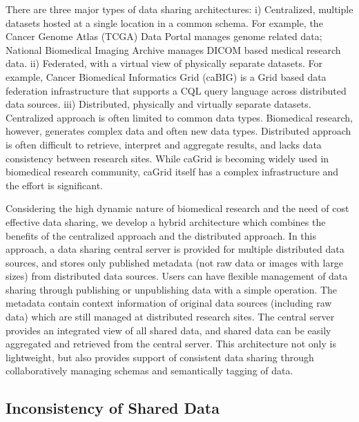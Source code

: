 \documentclass{doublecol-new}
\theoremstyle{TH}{
\newtheorem{lemma}{Lemma}
\newtheorem{theorem}[lemma]{Theorem}
\newtheorem{corrolary}[lemma]{Corrolary}
\newtheorem{conjecture}[lemma]{Conjecture}
\newtheorem{proposition}[lemma]{Proposition}
\newtheorem{claim}[lemma]{Claim}
\newtheorem{stheorem}[lemma]{Wrong Theorem}
\newtheorem{algorithm}{Algorithm}
}
\theoremstyle{THrm}{
\newtheorem{definition}{Definition}[section]
\newtheorem{question}{Question}[section]
\newtheorem{remark}{Remark}
\newtheorem{scheme}{Scheme}
}
\theoremstyle{THhit}{
\newtheorem{case}{Case}[section]
}
\begin{document}
There are three major types of data sharing architectures: i)
Centralized, multiple datasets hosted at a single location in a
common schema. For example, the Cancer Genome Atlas (TCGA) Data
Portal \cite{tcga} manages genome related data; National Biomedical
Imaging Archive \cite{nbia} manages DICOM based medical research
data. ii) Federated, with a virtual view of physically separate
datasets. For example, Cancer Biomedical Informatics Grid
(caBIG{\small \textregistered})  \cite{cabig} is a Grid based data
federation infrastructure that supports a CQL query language across
distributed data sources.  iii) Distributed, physically and
virtually separate datasets.  Centralized approach is often limited
to common data types. Biomedical research, however,  generates
complex data and often new data types.  Distributed approach is
often difficult to retrieve, interpret and aggregate results, and
lacks data consistency between research sites.  While caGrid is
becoming widely used in biomedical research community, caGrid itself
has a complex infrastructure and the effort is significant.


Considering the high dynamic nature of biomedical research and the
need of  cost effective data sharing, we develop a hybrid
architecture which combines the benefits of the centralized approach
and the distributed approach. In this approach, a data sharing
central server is provided for multiple distributed data sources,
and stores only published metadata (not raw data or images with
large sizes) from distributed data sources. Users can have flexible
management of data sharing through publishing or unpublishing data
with  a simple operation. The metadata contain context information
of original data sources (including raw data) which are still
managed at distributed research sites. The central server provides
an integrated view of all shared data, and shared data can be easily
aggregated and retrieved from the central server. This architecture
not only is lightweight, but also provides support of consistent
data sharing through collaboratively managing schemas and
semantically tagging of data.

\subsection{Inconsistency of Shared Data}
\end{document}
